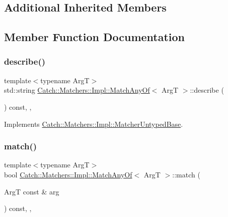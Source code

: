 \subsection*{Additional Inherited Members}


\subsection{Member Function Documentation}
\mbox{\label{structCatch_1_1Matchers_1_1Impl_1_1MatchAnyOf_a315285204df93d1f8e72f50dd66eb709}} 
\subsubsection{\texorpdfstring{describe()}{describe()}}
{\footnotesize\ttfamily template$<$typename ArgT$>$ \\
std\+::string \mbox{\hyperlink{structCatch_1_1Matchers_1_1Impl_1_1MatchAnyOf}{Catch\+::\+Matchers\+::\+Impl\+::\+Match\+Any\+Of}}$<$ ArgT $>$\+::describe (\begin{DoxyParamCaption}{ }\end{DoxyParamCaption}) const\hspace{0.3cm}{\ttfamily [inline]}, {\ttfamily [override]}, {\ttfamily [virtual]}}



Implements \mbox{\hyperlink{classCatch_1_1Matchers_1_1Impl_1_1MatcherUntypedBase_a91d3a907dbfcbb596077df24f6e11fe2}{Catch\+::\+Matchers\+::\+Impl\+::\+Matcher\+Untyped\+Base}}.

\mbox{\label{structCatch_1_1Matchers_1_1Impl_1_1MatchAnyOf_a8a3e8338f979e56277dcf553efb78dc0}} 
\subsubsection{\texorpdfstring{match()}{match()}}
{\footnotesize\ttfamily template$<$typename ArgT$>$ \\
bool \mbox{\hyperlink{structCatch_1_1Matchers_1_1Impl_1_1MatchAnyOf}{Catch\+::\+Matchers\+::\+Impl\+::\+Match\+Any\+Of}}$<$ ArgT $>$\+::match (\begin{DoxyParamCaption}\item[{ArgT const \&}]{arg }\end{DoxyParamCaption}) const\hspace{0.3cm}{\ttfamily [inline]}, {\ttfamily [override]}, {\ttfamily [virtual]}}



